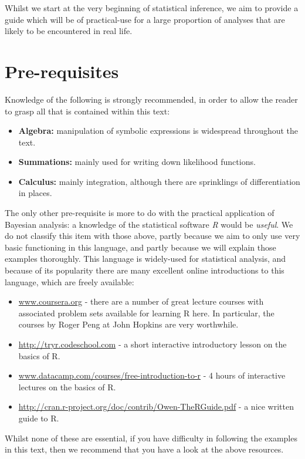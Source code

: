 \documentclass[11pt,fullpage]{book}
\begin{document}
Whilst we start at the very beginning of statistical inference, we aim to provide a guide which will be of practical-use for a large proportion of analyses that are likely to be encountered in real life.

\section{Pre-requisites}
Knowledge of the following is strongly recommended, in order to allow the reader to grasp all that is contained within this text:

\begin{itemize}
\item \textbf{Algebra:} manipulation of symbolic expressions is widespread throughout the text.
\item \textbf{Summations:} mainly used for writing down likelihood functions.
\item \textbf{Calculus:} mainly integration, although there are sprinklings of differentiation in places.
\end{itemize}

The only other pre-requisite is more to do with the practical application of Bayesian analysis: a knowledge of the statistical software \textit{R}\cite{RLanguage} would be \textit{useful}. We do not classify this item with those above, partly because we aim to only use very basic functioning in this language, and partly because we will explain those examples thoroughly. This language is widely-used for statistical analysis, and because of its popularity there are many excellent online introductions to this language, which are freely available:

\begin{itemize}
\item \url{www.coursera.org} - there are a number of great lecture courses with associated problem sets available for learning R here. In particular, the courses by Roger Peng at John Hopkins are very worthwhile.
\item \url{http://tryr.codeschool.com} - a short interactive introductory lesson on the basics of R. 
\item \url{www.datacamp.com/courses/free-introduction-to-r} - 4 hours of interactive lectures on the basics of R.
\item \url{http://cran.r-project.org/doc/contrib/Owen-TheRGuide.pdf} - a nice written guide to R.
\end{itemize}

Whilst none of these are essential, if you have difficulty in following the examples in this text, then we recommend that you have a look at the above resources.
\end{document}
